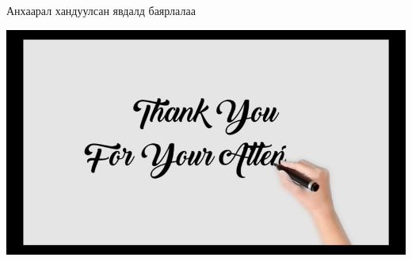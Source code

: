\documentclass[
  ignorenonframetext,
]{beamer}
\begin{document}
\begin{frame}{Анхаарал хандуулсан явдалд баярлалаа}
\protect\hypertarget{ux430ux43dux445ux430ux430ux440ux430ux43b-ux445ux430ux43dux434ux443ux443ux43bux441ux430ux43d-ux44fux432ux434ux430ux43bux434-ux431ux430ux44fux440ux43bux430ux43bux430ux430}{}

\includegraphics{sa.jpg}

\end{frame}
\end{document}
